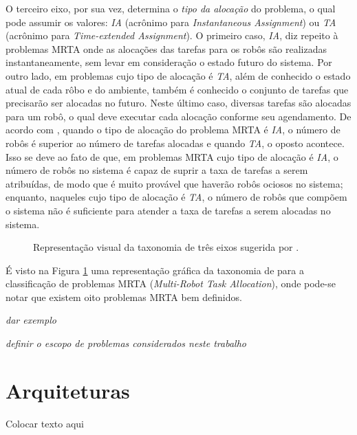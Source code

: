         O terceiro eixo, por sua vez, determina o \textit{tipo da alocação} do problema, o qual pode assumir os valores: \textit{IA} (acrônimo para \textit{Instantaneous Assignment}) ou \textit{TA} (acrônimo para \textit{Time-extended Assignment}). O primeiro caso, \textit{IA}, diz repeito à problemas MRTA onde as alocações das tarefas para os robôs são realizadas instantaneamente, sem levar em consideração o estado futuro do sistema. Por outro lado, em problemas cujo tipo de alocação é \textit{TA}, além de conhecido o estado atual de cada rôbo e do ambiente, também é conhecido o conjunto de tarefas que precisarão ser alocadas no futuro. Neste último caso, diversas tarefas são alocadas para um robô, o qual deve executar cada alocação conforme seu agendamento. De acordo com \cite{ref:bastos2008utility}, quando o tipo de alocação do problema MRTA é \textit{IA}, o número de robôs é superior ao número de tarefas alocadas e quando \textit{TA}, o oposto acontece. Isso se deve ao fato de que, em problemas MRTA cujo tipo de alocação é \textit{IA}, o número de robôs no sistema é capaz de suprir a taxa de tarefas a serem atribuídas, de modo que é muito provável que haverão robôs ociosos no sistema; enquanto, naqueles cujo tipo de alocação é \textit{TA}, o número de robôs que compõem o sistema não é suficiente para atender a taxa de tarefas a serem alocadas no sistema.
        
        \begin{figure}[htb]
            \centering
            
            \caption{Representação visual da taxonomia de três eixos sugerida por \cite{ref:gerkey2004taxonomy}.} \label{fig:taxomia_mrta}
        \end{figure}
        
        É visto na Figura \ref{fig:taxomia_mrta} uma representação gráfica da taxonomia de \cite{ref:gerkey2004taxonomy} para a classificação de problemas MRTA (\textit{Multi-Robot Task Allocation}), onde pode-se notar que existem oito problemas MRTA bem definidos.
        
        \emph{\color{red} dar exemplo}
        
        \emph{\color{red} definir o escopo de problemas considerados neste trabalho}
    
    \section{Arquiteturas} \label{sec:sec3_3}
        Colocar texto aqui
    
